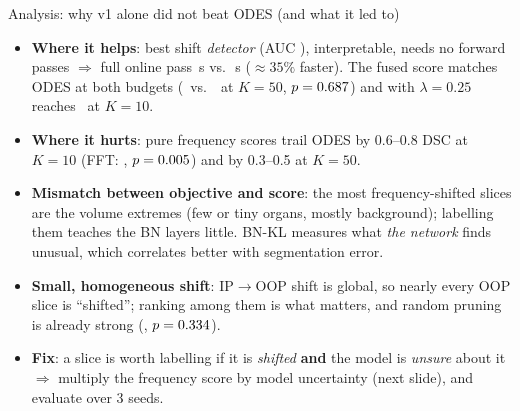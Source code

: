 \documentclass[aspectratio=169,10pt]{beamer}
\begin{document}
\begin{frame}{Analysis: why v1 alone did not beat ODES (and what it led to)}
  \begin{itemize}\small
    \item \textbf{Where it helps}: best shift \emph{detector} (AUC \AUCFFT), interpretable, needs no forward passes $\Rightarrow$ full online pass \TFREQKTen\,s vs.\ \TBNKTen\,s ($\approx 35\%$ faster). The fused score matches ODES at both budgets (\DFUSEDKFiftyLFifty\ vs.\ \DBNKFifty\ at $K=50$, $p=0.687$) and with $\lambda=0.25$ reaches \DFUSEDKTenLQuarter\ at $K=10$.
    \item \textbf{Where it hurts}: pure frequency scores trail ODES by 0.6--0.8 DSC at $K=10$ (FFT: \DiffFFTKTen, $p=0.005$) and by 0.3--0.5 at $K=50$.
    \item \textbf{Mismatch between objective and score}: the most frequency-shifted slices are the volume extremes (few or tiny organs, mostly background); labelling them teaches the BN layers little. BN-KL measures what \emph{the network} finds unusual, which correlates better with segmentation error.
    \item \textbf{Small, homogeneous shift}: IP$\rightarrow$OOP shift is global, so nearly every OOP slice is ``shifted''; ranking among them is what matters, and random pruning is already strong (\DRANDOMKTen, $p=0.334$).
    \item \textbf{Fix}: a slice is worth labelling if it is \emph{shifted} \textbf{and} the model is \emph{unsure} about it $\Rightarrow$ multiply the frequency score by model uncertainty (next slide), and evaluate over 3 seeds.
  \end{itemize}
\end{frame}
\end{document}
